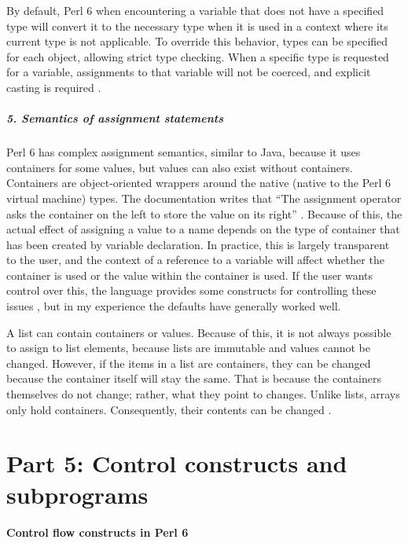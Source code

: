\documentclass[14pt,english]{extarticle}
\begin{document}
By default, Perl 6 when encountering a variable that does not have
a specified type will convert it to the necessary type when it is
used in a context where its current type is not applicable. To override
this behavior, types can be specified for each object, allowing strict
type checking. When a specific type is requested for a variable, assignments
to that variable will not be coerced, and explicit casting is required
\cite{Documentation}.


\subsubsection*{5. Semantics of assignment statements}

Perl 6 has complex assignment semantics, similar to Java, because
it uses containers for some values, but values can also exist without
containers. Containers are object-oriented wrappers around the native
(native to the Perl 6 virtual machine) types. The documentation writes
that ``The assignment operator asks the container on the left to
store the value on its right'' \cite{Documentation}. Because of
this, the actual effect of assigning a value to a name depends on
the type of container that has been created by variable declaration.
In practice, this is largely transparent to the user, and the context
of a reference to a variable will affect whether the container is
used or the value within the container is used. If the user wants
control over this, the language provides some constructs for controlling
these issues \cite{Documentation}, but in my experience the defaults
have generally worked well.

A list can contain containers or values. Because of this, it is not
always possible to assign to list elements, because lists are immutable
and values cannot be changed. However, if the items in a list are
containers, they can be changed because the container itself will
stay the same. That is because the containers themselves do not change;
rather, what they point to changes. Unlike lists, arrays only hold
containers. Consequently, their contents can be changed \cite{Documentation}.


\part*{Part 5: Control constructs and subprograms}


\subsection*{Control flow constructs in Perl 6}
\end{document}
